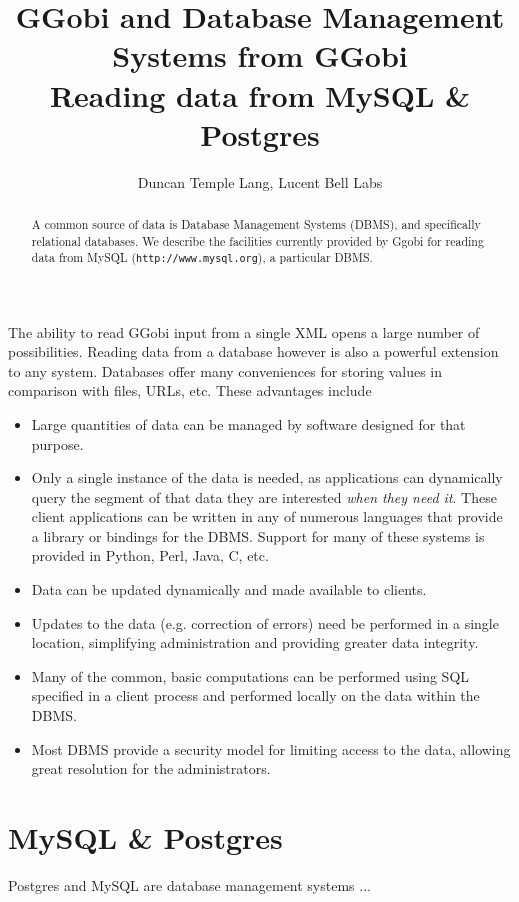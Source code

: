\documentclass{article}
\title{GGobi and Database Management Systems from GGobi\\ 
Reading data from MySQL \& Postgres
}
\author{
Duncan Temple Lang, Lucent Bell Labs
}
\def\URL#1{\texttt{#1}}
\begin{document}
\maketitle

\begin{abstract}
  A common source of data is Database Management Systems (DBMS), and
  specifically relational databases.  We describe the facilities
  currently provided by Ggobi for reading data from MySQL
  (\URL{http://www.mysql.org}), a particular DBMS.
\end{abstract}

The ability to read GGobi input from a single XML opens a large number
of possibilities.  Reading data from a database however is also a
powerful extension to any system.  Databases offer many conveniences
for storing values in comparison with files, URLs, etc.
These advantages include
\begin{itemize}

\item Large quantities of data can be managed by software
 designed for that purpose. 

\item Only a single instance of the data is needed, as applications
  can dynamically query the segment of that data they are interested
  \textsl{when they need it}.  These client applications can be
  written in any of numerous languages that provide a library or
  bindings for the DBMS.  Support for many of these systems is
  provided in Python, Perl, Java, C, etc.

\item Data can be updated dynamically and made available to clients.

\item Updates to the data (e.g. correction of errors) need be
  performed in a single location, simplifying administration
and providing greater data integrity.

\item Many of the common, basic computations can be performed
using SQL specified in a client process and performed locally on the
data within the DBMS.

\item Most DBMS provide a security model for limiting access
to the data, allowing great resolution for the administrators.

\end{itemize}


\section{MySQL \& Postgres}
Postgres and MySQL are database management systems ...
\end{document}
